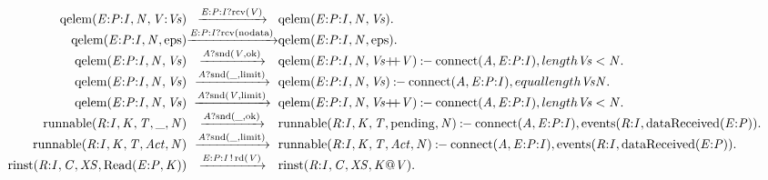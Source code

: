 \[\begin{array}{r@{}c@{}l}
\\\Pfact{\Tstep{\Tqelem{\Tep{\Tvar{E}}{\Tvar{P}}{\Tvar{I}}}{\Tvar{N}}{\Tcons{\Tvar{V}}{\Tvar{Vs}}}}{\Thear{\Tep{\Tvar{E}}{\Tvar{P}}{\Tvar{I}}}{\Trcv{\Tvar{V}}}}{\Tqelem{\Tep{\Tvar{E}}{\Tvar{P}}{\Tvar{I}}}{\Tvar{N}}{\Tvar{Vs}}}}.
\\\Pfact{\Tstep{\Tqelem{\Tep{\Tvar{E}}{\Tvar{P}}{\Tvar{I}}}{\Tvar{N}}{\Tatom{eps}}}{\Thear{\Tep{\Tvar{E}}{\Tvar{P}}{\Tvar{I}}}{\Trcv{\Tatom{nodata}}}}{\Tqelem{\Tep{\Tvar{E}}{\Tvar{P}}{\Tvar{I}}}{\Tvar{N}}{\Tatom{eps}}}}.
\\\Prule{\Tstep{\Tqelem{\Tep{\Tvar{E}}{\Tvar{P}}{\Tvar{I}}}{\Tvar{N}}{\Tvar{Vs}}}{\Thear{\Tvar{A}}{\Tsnd{\Tvar{V}}{\Tatom{ok}}}}{\Tqelem{\Tep{\Tvar{E}}{\Tvar{P}}{\Tvar{I}}}{\Tvar{N}}{\Tseq{\Tvar{Vs}}{\Tvar{V}}}}}{\Tconnect{\Tvar{A}}{\Tep{\Tvar{E}}{\Tvar{P}}{\Tvar{I}}},\Tless{\Tlength{\Tvar{Vs}}}{\Tvar{N}}}.
\\\Prule{\Tstep{\Tqelem{\Tep{\Tvar{E}}{\Tvar{P}}{\Tvar{I}}}{\Tvar{N}}{\Tvar{Vs}}}{\Thear{\Tvar{A}}{\Tsnd{\_}{\Tatom{limit}}}}{\Tqelem{\Tep{\Tvar{E}}{\Tvar{P}}{\Tvar{I}}}{\Tvar{N}}{\Tvar{Vs}}}}{\Tconnect{\Tvar{A}}{\Tep{\Tvar{E}}{\Tvar{P}}{\Tvar{I}}},\Tequal{\Tlength{\Tvar{Vs}}}{\Tvar{N}}}.
\\\Prule{\Tstep{\Tqelem{\Tep{\Tvar{E}}{\Tvar{P}}{\Tvar{I}}}{\Tvar{N}}{\Tvar{Vs}}}{\Thear{\Tvar{A}}{\Tsnd{\Tvar{V}}{\Tatom{limit}}}}{\Tqelem{\Tep{\Tvar{E}}{\Tvar{P}}{\Tvar{I}}}{\Tvar{N}}{\Tseq{\Tvar{Vs}}{\Tvar{V}}}}}{\Tconnect{\Tvar{A}}{\Tep{\Tvar{E}}{\Tvar{P}}{\Tvar{I}}},\Tless{\Tlength{\Tvar{Vs}}}{\Tvar{N}}}.
\\\Prule{\Tstep{\Trunnable{\Tr{\Tvar{R}}{\Tvar{I}}}{\Tvar{K}}{\Tvar{T}}{\_}{\Tvar{N}}}{\Thear{\Tvar{A}}{\Tsnd{\_}{\Tatom{ok}}}}{\Trunnable{\Tr{\Tvar{R}}{\Tvar{I}}}{\Tvar{K}}{\Tvar{T}}{\Tatom{pending}}{\Tvar{N}}}}{\Tconnect{\Tvar{A}}{\Tep{\Tvar{E}}{\Tvar{P}}{\Tvar{I}}},\Tevents{\Tr{\Tvar{R}}{\Tvar{I}}}{\TdataReceived{\Te{\Tvar{E}}{\Tvar{P}}}}}.
\\\Prule{\Tstep{\Trunnable{\Tr{\Tvar{R}}{\Tvar{I}}}{\Tvar{K}}{\Tvar{T}}{\Tvar{Act}}{\Tvar{N}}}{\Thear{\Tvar{A}}{\Tsnd{\_}{\Tatom{limit}}}}{\Trunnable{\Tr{\Tvar{R}}{\Tvar{I}}}{\Tvar{K}}{\Tvar{T}}{\Tvar{Act}}{\Tvar{N}}}}{\Tconnect{\Tvar{A}}{\Tep{\Tvar{E}}{\Tvar{P}}{\Tvar{I}}},\Tevents{\Tr{\Tvar{R}}{\Tvar{I}}}{\TdataReceived{\Te{\Tvar{E}}{\Tvar{P}}}}}.
\\\Pfact{\Tstep{\Trinst{\Tr{\Tvar{R}}{\Tvar{I}}}{\Tvar{C}}{\Tvar{XS}}{\TrteRead{\Te{\Tvar{E}}{\Tvar{P}}}{\Tvar{K}}}}{\Tsay{\Tep{\Tvar{E}}{\Tvar{P}}{\Tvar{I}}}{\Trd{\Tvar{V}}}}{\Trinst{\Tr{\Tvar{R}}{\Tvar{I}}}{\Tvar{C}}{\Tvar{XS}}{\Tap{\Tvar{K}}{\Tvar{V}}}}}.

\end{array}\]
